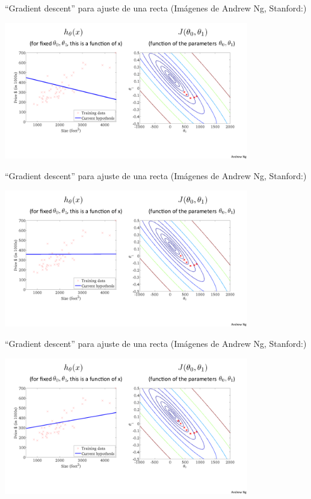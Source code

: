 \documentclass[aspectratio=169]{beamer}
\begin{document}
\begin{frame}{``Gradient descent'' para ajuste de una recta  {\scriptsize (Imágenes de Andrew Ng, Stanford:)}}

\begin{center}
  \includegraphics[height=6cm]{ng-gradient5.png}
\end{center}
\end{frame}
\begin{frame}{``Gradient descent'' para ajuste de una recta  {\scriptsize (Imágenes de Andrew Ng, Stanford:)}}

\begin{center}
  \includegraphics[height=6cm]{ng-gradient6.png}
\end{center}
\end{frame}

\begin{frame}{``Gradient descent'' para ajuste de una recta  {\scriptsize (Imágenes de Andrew Ng, Stanford:)}}

\begin{center}
  \includegraphics[height=6cm]{ng-gradient7.png}
\end{center}
\end{frame}
\end{document}
